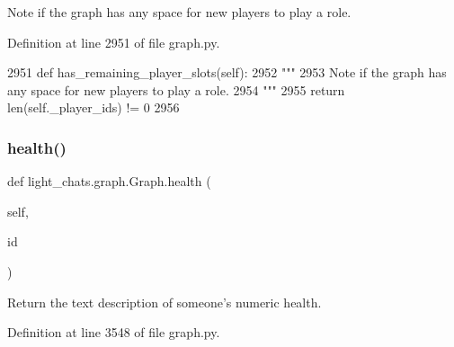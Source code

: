 \begin{DoxyVerb}Note if the graph has any space for new players to play a role.
\end{DoxyVerb}
 

Definition at line 2951 of file graph.\+py.


\begin{DoxyCode}
2951     \textcolor{keyword}{def }has\_remaining\_player\_slots(self):
2952         \textcolor{stringliteral}{"""}
2953 \textcolor{stringliteral}{        Note if the graph has any space for new players to play a role.}
2954 \textcolor{stringliteral}{        """}
2955         \textcolor{keywordflow}{return} len(self.\_player\_ids) != 0
2956 
\end{DoxyCode}
\mbox{\label{classlight__chats_1_1graph_1_1Graph_a3709592a97b55342b767bedb9db16267}} 
\subsubsection{\texorpdfstring{health()}{health()}}
{\footnotesize\ttfamily def light\+\_\+chats.\+graph.\+Graph.\+health (\begin{DoxyParamCaption}\item[{}]{self,  }\item[{}]{id }\end{DoxyParamCaption})}

\begin{DoxyVerb}Return the text description of someone's numeric health.
\end{DoxyVerb}
 

Definition at line 3548 of file graph.\+py.


